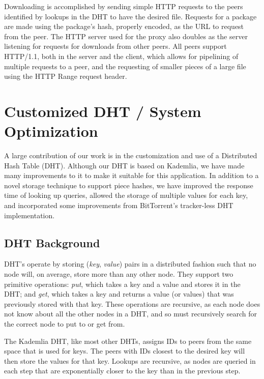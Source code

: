 \documentclass[conference]{IEEEtran}
\begin{document}
Downloading is accomplished by sending simple HTTP requests to the
peers identified by lookups in the DHT to have the desired file.
Requests for a package are made using the package's hash, properly
encoded, as the URL to request from the peer. The HTTP server used
for the proxy also doubles as the server listening for requests for
downloads from other peers. All peers support HTTP/1.1, both in the
server and the client, which allows for pipelining of multiple
requests to a peer, and the requesting of smaller pieces of a large
file using the HTTP Range request header.


\section{Customized DHT / System Optimization}
\label{custom_dht}

A large contribution of our work is in the customization and use of
a Distributed Hash Table (DHT). Although our DHT is based on
Kademlia, we have made many improvements to it to make it suitable
for this application. In addition to a novel storage technique to
support piece hashes, we have improved the response time of looking
up queries, allowed the storage of multiple values for each key, and
incorporated some improvements from BitTorrent's tracker-less DHT
implementation.

\subsection{DHT Background}
\label{dht}

DHT's operate by storing (\emph{key}, \emph{value}) pairs in a
distributed fashion such that no node will, on average, store more
than any other node. They support two primitive operations:
\emph{put}, which takes a key and a value and stores it in the DHT;
and \emph{get}, which takes a key and returns a value (or values)
that was previously stored with that key. These operations are
recursive, as each node does not know about all the other nodes in a
DHT, and so must recursively search for the correct node to put to
or get from.

The Kademlia DHT, like most other DHTs, assigns IDs to peers from
the same space that is used for keys. The peers with IDs closest to
the desired key will then store the values for that key. Lookups are
recursive, as nodes are queried in each step that are exponentially
closer to the key than in the previous step.
\end{document}

